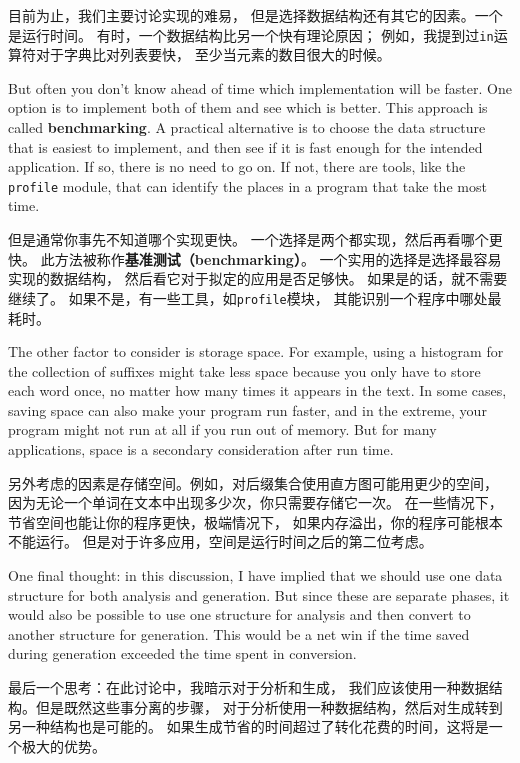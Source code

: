 \documentclass[10pt]{book}
\begin{document}
\begin{CJK}{UTF8}{gbsn}
目前为止，我们主要讨论实现的难易，
但是选择数据结构还有其它的因素。一个是运行时间。
有时，一个数据结构比另一个快有理论原因；
例如，我提到过{\tt in}运算符对于字典比对列表要快，
至少当元素的数目很大的时候。

But often you don't know ahead of time which implementation will
be faster.  One option is to implement both of them and see which
is better.  This approach is called {\bf benchmarking}.  A practical
alternative is to choose the data structure that is
easiest to implement, and then see if it is fast enough for the
intended application.  If so, there is no need to go on.  If not,
there are tools, like the {\tt profile} module, that can identify
the places in a program that take the most time.

但是通常你事先不知道哪个实现更快。
一个选择是两个都实现，然后再看哪个更快。
此方法被称作{\bf 基准测试（benchmarking）}。
一个实用的选择是选择最容易实现的数据结构，
然后看它对于拟定的应用是否足够快。
如果是的话，就不需要继续了。
如果不是，有一些工具，如{\tt profile}模块，
其能识别一个程序中哪处最耗时。

The other factor to consider is storage space.  For example, using a
histogram for the collection of suffixes might take less space because
you only have to store each word once, no matter how many times it
appears in the text.  In some cases, saving space can also make your
program run faster, and in the extreme, your program might not run at
all if you run out of memory.  But for many applications, space is a
secondary consideration after run time.

另外考虑的因素是存储空间。例如，对后缀集合使用直方图可能用更少的空间，
因为无论一个单词在文本中出现多少次，你只需要存储它一次。
在一些情况下，节省空间也能让你的程序更快，极端情况下，
如果内存溢出，你的程序可能根本不能运行。
但是对于许多应用，空间是运行时间之后的第二位考虑。

One final thought: in this discussion, I have implied that
we should use one data structure for both analysis and generation.  But
since these are separate phases, it would also be possible to use one
structure for analysis and then convert to another structure for
generation.  This would be a net win if the time saved during
generation exceeded the time spent in conversion.

最后一个思考：在此讨论中，我暗示对于分析和生成，
我们应该使用一种数据结构。但是既然这些事分离的步骤，
对于分析使用一种数据结构，然后对生成转到另一种结构也是可能的。
如果生成节省的时间超过了转化花费的时间，这将是一个极大的优势。


\end{CJK}
\end{document}
